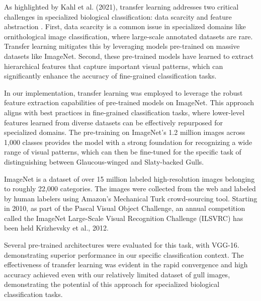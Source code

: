 \documentclass[a4paper,12pt]{article}
\begin{document}
As highlighted by Kahl et al. (2021), transfer learning addresses two critical challenges in specialized biological classification: data scarcity and feature abstraction \citet{kahl2021}. First, data scarcity is a common issue in specialized domains like ornithological image classification, where large-scale annotated datasets are rare. Transfer learning mitigates this by leveraging models pre-trained on massive datasets like ImageNet. Second, these pre-trained models have learned to extract hierarchical features that capture important visual patterns, which can significantly enhance the accuracy of fine-grained classification tasks.

In our implementation, transfer learning was employed to leverage the robust feature extraction capabilities of pre-trained models on ImageNet. This approach aligns with best practices in fine-grained classification tasks, where lower-level features learned from diverse datasets can be effectively repurposed for specialized domains. The pre-training on ImageNet's 1.2 million images across 1,000 classes provides the model with a strong foundation for recognizing a wide range of visual patterns, which can then be fine-tuned for the specific task of distinguishing between Glaucous-winged and Slaty-backed Gulls.

ImageNet is a dataset of over 15 million labeled high-resolution images belonging to roughly 22,000
categories. The images were collected from the web and labeled by human labelers using Amazon’s Mechanical Turk crowd-sourcing tool. Starting in 2010, as part of the Pascal Visual Object
Challenge, an annual competition called the ImageNet Large-Scale Visual Recognition Challenge
(ILSVRC) has been held {Krizhevsky et al., 2012}.

Several pre-trained architectures were evaluated for this task, with VGG-16. \citet{simonyan2014vgg} demonstrating superior performance in our specific classification context. The effectiveness of transfer learning was evident in the rapid convergence and high accuracy achieved even with our relatively limited dataset of gull images, demonstrating the potential of this approach for specialized biological classification tasks.

\newpage


\end{document}
